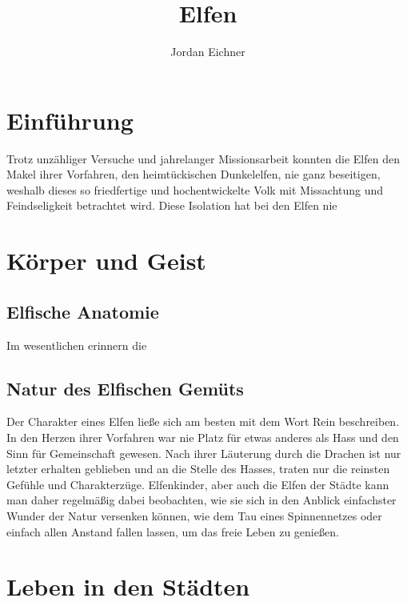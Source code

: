 \documentclass[a4paper,12pt,oneside]{book}
\title{Elfen}
\author{Jordan Eichner}
\date{}
\begin{document}
\maketitle
\tableofcontents

\part{Einführung}
Trotz unzähliger Versuche und jahrelanger Missionsarbeit konnten die Elfen den Makel ihrer Vorfahren, den heimtückischen Dunkelelfen, nie ganz beseitigen, weshalb dieses so friedfertige und hochentwickelte Volk mit Missachtung und Feindseligkeit betrachtet wird. Diese Isolation hat bei den Elfen nie  

\part{Körper und Geist}
\chapter{Elfische Anatomie}
Im wesentlichen erinnern die 
\chapter{Natur des Elfischen Gemüts}
Der Charakter eines Elfen ließe sich am besten mit dem Wort Rein beschreiben. In den Herzen ihrer Vorfahren war nie Platz für etwas anderes als Hass und den Sinn für Gemeinschaft gewesen. Nach ihrer Läuterung durch die Drachen ist nur letzter erhalten geblieben und an die Stelle des Hasses, traten nur die reinsten Gefühle und Charakterzüge. Elfenkinder, aber auch die Elfen der Städte kann man daher regelmäßig dabei beobachten, wie sie sich in den Anblick einfachster Wunder der Natur versenken können, wie dem Tau eines Spinnennetzes oder einfach allen Anstand fallen lassen, um das freie Leben zu genießen.    

\part{Leben in den Städten}
\end{document}
